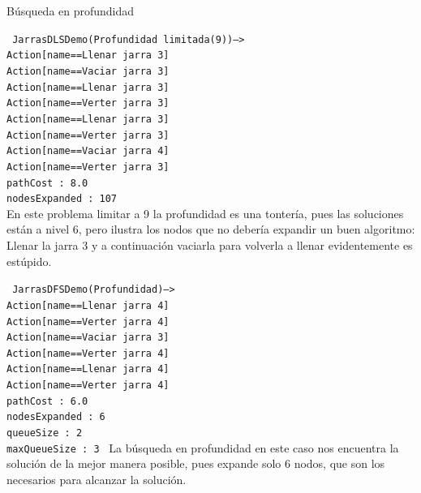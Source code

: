 \documentclass[11pt, a4paper, spanish, openright, twoside]{book}
\begin{document}
\begin{section}{Búsqueda en profundidad}

\texttt{
	JarrasDLSDemo(Profundidad limitada(9))-->	\\
	Action[name==Llenar jarra 3]		\\
	Action[name==Vaciar jarra 3]		\\
	Action[name==Llenar jarra 3]		\\
	Action[name==Verter jarra 3]		\\
	Action[name==Llenar jarra 3]		\\
	Action[name==Verter jarra 3]		\\
	Action[name==Vaciar jarra 4]		\\
	Action[name==Verter jarra 3]		\\
	pathCost : 8.0					\\
	nodesExpanded : 107			\\
}
En este problema limitar a 9 la profundidad es una tontería, pues las soluciones están a nivel 6, pero ilustra los nodos que no debería expandir 
un buen algoritmo: Llenar la jarra 3 y a continuación vaciarla para volverla a llenar evidentemente es estúpido.

\texttt{
	JarrasDFSDemo(Profundidad)-->	\\
	Action[name==Llenar jarra 4]		\\
	Action[name==Verter jarra 4]		\\
	Action[name==Vaciar jarra 3]		\\
	Action[name==Verter jarra 4]		\\
	Action[name==Llenar jarra 4]		\\
	Action[name==Verter jarra 4]		\\
	pathCost : 6.0					\\
	nodesExpanded : 6				\\
	queueSize : 2					\\
	maxQueueSize : 3				
}
La búsqueda en profundidad en este caso nos encuentra la solución de la mejor manera posible, pues expande solo 6 nodos, que son los necesarios para alcanzar la solución.

\end{section}
\end{document}

